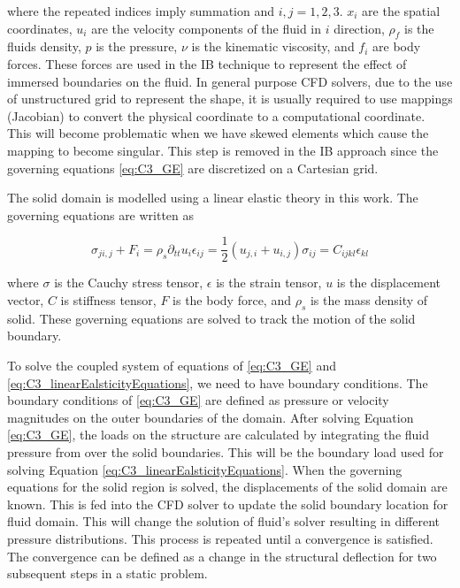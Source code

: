 where the repeated indices imply summation and $i,j=1,2,3$. $x_i$ are the spatial coordinates, $u_i$ are the velocity components of the fluid in $i$ direction, $\rho_f$ is the fluids density, $p$ is the pressure, $\nu$ is the kinematic viscosity, and $f_i$ are body forces. These forces are used in the IB technique to represent the effect of immersed boundaries on the fluid. In general purpose CFD solvers, due to the use of unstructured grid to represent the shape, it is usually required to use mappings (Jacobian) to convert the physical coordinate to a computational coordinate. This will become problematic when we have skewed elements which cause the mapping to become singular. This step is removed in the IB approach since the governing equations \eqref{eq:C3_GE} are discretized on a Cartesian  grid.

The solid domain is modelled using a linear elastic theory in this work. The governing equations are written as

\begin{subequations}\label{eq:C3_linearEalsticityEquations}
\begin{equation}
	\sigma_{ji,j} + F_i = \rho_s \partial_{tt} u_i
\end{equation}
\begin{equation}
	\epsilon_{ij} = \frac{1}{2} \left( u_{j,i} + u_{i,j} \right)
\end{equation}
\begin{equation}
	\sigma_{ij} = C_{ijkl} \epsilon_{kl}
\end{equation}
\end{subequations}

where $\sigma$ is the Cauchy stress tensor, $\epsilon$ is the strain tensor, $u$ is the displacement vector, $C$ is stiffness tensor, $F$ is the body force, and $\rho_s$ is the mass density of solid. These governing equations are solved to track the motion of the solid boundary. 

To solve the coupled system of equations of \eqref{eq:C3_GE} and \eqref{eq:C3_linearEalsticityEquations}, we need to have boundary conditions. The boundary conditions of \eqref{eq:C3_GE} are defined as pressure or velocity magnitudes on the outer boundaries of the domain. After solving Equation \eqref{eq:C3_GE}, the loads on the structure are calculated by integrating the fluid pressure from over the solid boundaries. This will be the boundary load used for solving Equation \eqref{eq:C3_linearEalsticityEquations}. When the governing equations for the solid region is solved, the displacements of the solid domain are known. This is fed into the CFD solver to update the solid boundary location for fluid domain. This will change the solution of fluid's solver resulting in different pressure distributions. This process is repeated until a convergence is satisfied. The convergence can be defined as a change in the structural deflection for two subsequent steps in a static problem.

